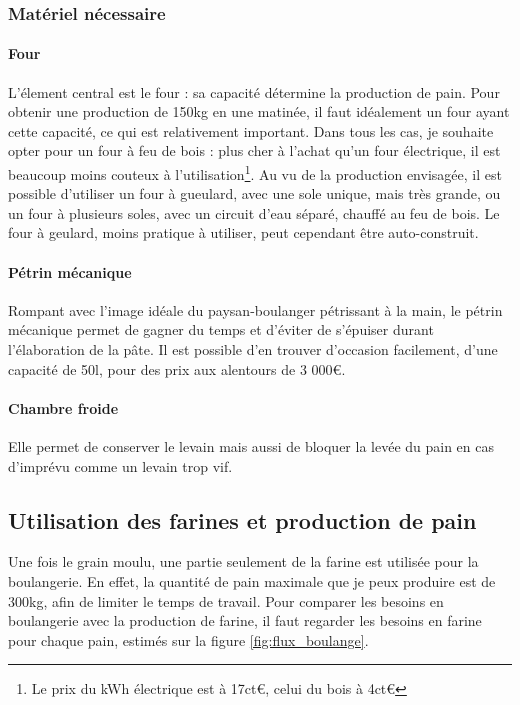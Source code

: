 \documentclass{book}
\begin{document}
\subsubsection{Matériel nécessaire}

\paragraph{Four} L'élement central est le four : sa capacité détermine la production de pain. Pour obtenir une production de 150kg en une matinée, il faut idéalement un four ayant cette capacité, ce qui est relativement important. Dans tous les cas, je souhaite opter pour un four à feu de bois : plus cher à l'achat qu'un four électrique, il est beaucoup moins couteux à l'utilisation\footnote{Le prix du kWh électrique est à 17ct\euro{}, celui du bois à 4ct\euro{}}. Au vu de la production envisagée, il est possible d'utiliser un four à gueulard, avec une sole unique, mais très grande, ou un four à plusieurs soles, avec un circuit d'eau séparé, chauffé au feu de bois. Le four à geulard, moins pratique à utiliser, peut cependant être auto-construit.

\paragraph{Pétrin mécanique} Rompant avec l'image idéale du paysan-boulanger pétrissant à la main, le pétrin mécanique permet de gagner du temps et d'éviter de s'épuiser durant l'élaboration de la pâte. Il est possible d'en trouver d'occasion facilement, d'une capacité de 50l, pour des prix aux alentours de 3 000\euro{}.

\paragraph{Chambre froide} Elle permet de conserver le levain mais aussi de bloquer la levée du pain en cas d'imprévu comme un levain trop vif. 

\subsection{Utilisation des farines et production de pain}

Une fois le grain moulu, une partie seulement de la farine est utilisée pour la boulangerie. En effet, la quantité de pain maximale que je peux produire est de 300kg, afin de limiter le temps de travail. Pour comparer les besoins en boulangerie avec la production de farine, il faut regarder les besoins en farine pour chaque pain, estimés sur la figure \ref{fig:flux_boulange}. 
\end{document}
